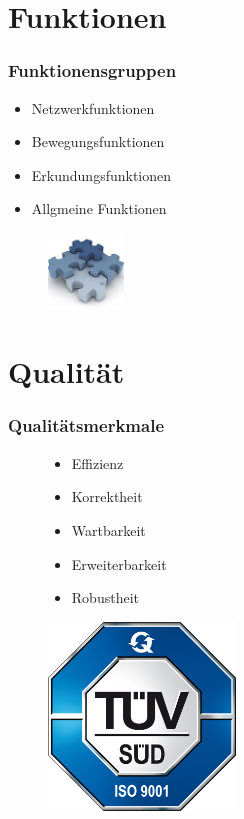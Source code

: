 \documentclass{beamer}
\begin{document}
\begin{frame}
		
		 
\end{frame}

\section{Funktionen}
\begin{frame}
  \frametitle{Funktionensgruppen}
  
  	\begin{itemize}
		\item Netzwerkfunktionen
		\item Bewegungsfunktionen
		\item Erkundungsfunktionen
		\item Allgmeine Funktionen
	\end{itemize}  
	\begin{figure}[bp]
		\includegraphics[height=2cm]{funktional.jpg} 
	\end{figure}
	
\end{frame}


\section{Qualität}
\begin{frame}
  \frametitle{Qualitätsmerkmale}
	\begin{figure}[htbp]
	
	\begin{minipage}[t]{0.5\textwidth}
		\begin{itemize}
			\item Effizienz
			\item Korrektheit
			\item Wartbarkeit
			\item Erweiterbarkeit
			\item Robustheit
		\end{itemize}
	\end{minipage}
	\hfill
	\begin{minipage}[t]{5cm}
		\vspace{0pt}
		\includegraphics[height=5cm]{qualitt.jpg} 
	\end{minipage}
   \end{figure}  	  
  
\end{frame}
\end{document}
